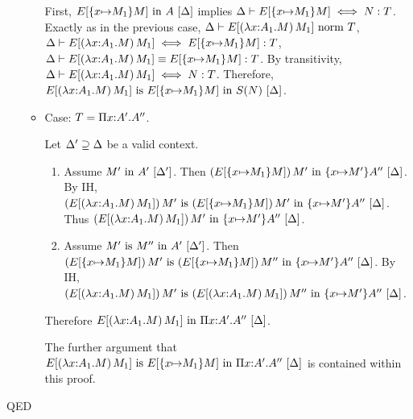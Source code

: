 \documentclass{article}
\theoremstyle{break}
\newcommand{\qed}{\mbox{QED}}
\newenvironment{proof}{\noindent{\bf Proof:}\hspace*{0.5em}}{\hspace*{\fill}\qed}
\begin{document}
\begin{proof}
\begin{enumerate}
\begin{itemize}
First, 
${E[\{x{\mapsto}M_1\}{M}]}\mathrm{\ in\ }{A}\ [\Delta]$
implies
$\Delta\vdash E[\{x{\mapsto}M_1\}{M}] \iff N : T$.
Exactly as in the previous case,
${\Delta}\vdash{E[(\lambda x{:}A_1.M)\,M_1]}\mbox{\ norm\ }{T}$,
$\Delta\vdash E[(\lambda x{:}A_1.M)\,M_1] \iff E[\{x{\mapsto}M_1\}{M}] : T$,
$\Delta\vdash E[(\lambda x{:}A_1.M)\,M_1] \equiv E[\{x{\mapsto}M_1\}{M}] : T$.
By transitivity,
$\Delta\vdash E[(\lambda x{:}A_1.M)\,M_1] \iff N : T$.
Therefore,
${E[(\lambda x{:}A_1.M)\,M_1]}\mathrm{\ is\ }{E[\{x{\mapsto}M_1\}{M}]}\mathrm{\ in\ }{S(N)}\ [\Delta]$.

\item Case: $T = \Pi x{:}A'.A''$.

Let $\Delta'\supseteq\Delta$ be a valid context.
\begin{enumerate}
\item 
Assume ${M'}\mathrm{\ in\ }{A'}\ [\Delta']$. Then 
${(E[\{x{\mapsto}M_1\}{M}])\,M'}\mathrm{\ in\ }{\{x{\mapsto}M'\}A''}\ [\Delta]$.
By IH,
${(E[(\lambda x{:}A_1.M)\,M_1])\,M'}\mathrm{\ is\ }{(E[\{x{\mapsto}M_1\}{M}])\,M'}\mathrm{\ in\ }{\{x{\mapsto}M'\}A''}\ [\Delta]$.
Thus
${(E[(\lambda x{:}A_1.M)\,M_1])\,M'}\mathrm{\ in\ }{\{x{\mapsto}M'\}A''}\ [\Delta]$.
\item Assume ${M'}\mathrm{\ is\ }{M''}\mathrm{\ in\ }{A'}\ [\Delta']$.
Then
${(E[\{x{\mapsto}M_1\}{M}])\,M'}\mathrm{\ is\ }{(E[\{x{\mapsto}M_1\}{M}])\,M''}\mathrm{\ in\ }{\{x{\mapsto}M'\}A''}\ [\Delta]$.
By IH, 
${(E[(\lambda x{:}A_1.M)\,M_1])\,M'}\mathrm{\ is\ }{(E[(\lambda x{:}A_1.M)\,M_1])\,M''}\mathrm{\ in\ }{\{x{\mapsto}M'\}A''}\ [\Delta]$.
\end{enumerate}
Therefore 
${E[(\lambda x{:}A_1.M)\,M_1]}\mathrm{\ in\ }{\Pi x{:}A'.A''}\ [\Delta]$.

The further argument that 
${E[(\lambda x{:}A_1.M)\,M_1]}\mathrm{\ is\ }{E[\{x{\mapsto}M_1\}{M}]}\mathrm{\ in\ }{\Pi x{:}A'.A''}\ [\Delta]$ is
contained within this proof.


\end{itemize}
\end{enumerate}
\end{proof}
\end{document}
